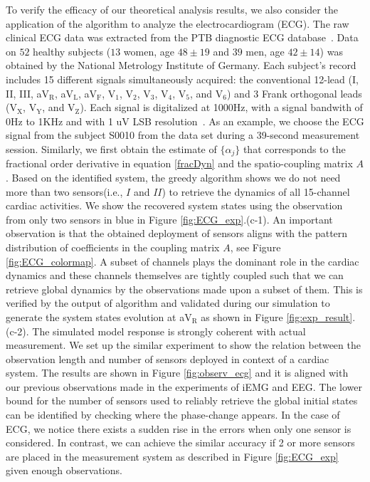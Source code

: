 To verify the efficacy of our theoretical analysis results, we also consider the application of the algorithm to analyze the electrocardiogram (ECG). The raw clinical ECG data was extracted from the PTB diagnostic ECG database~\cite{goldberger2000physiobank}. Data on $52$ healthy subjects ($13$ women, age $48 \pm 19$ and $39$ men, age $42 \pm 14$) was obtained by the National Metrology Institute of Germany. Each subject's record includes 15 different signals simultaneously acquired: the conventional 12-lead (I, II, III, aV$_{\text{R}}$, aV$_{\text{L}}$, aV$_{\text{F}}$, V$_{\text{1}}$, V$_{\text{2}}$, V$_{\text{3}}$, V$_{\text{4}}$, V$_{\text{5}}$, and V$_{\text{6}}$) and 3 Frank orthogonal leads (V$_{\text{X}}$, V$_{\text{Y}}$, and V$_{\text{Z}}$). Each signal is digitalized at 1000Hz, with a signal bandwith of 0Hz to 1KHz and with 1 uV LSB resolution~\cite{Bousseljot1995}. As an example, we choose the ECG signal from the subject S0010 from the data set during a 39-second measurement session. Similarly, we first obtain the estimate of $\{\alpha_{j}\}$ that corresponds to the fractional order derivative in equation \eqref{fracDyn} and the spatio-coupling matrix $A$. Based on the identified system, the greedy algorithm shows we do not need more than two sensors(i.e., $I$ and $II$) to retrieve the dynamics of all 15-channel cardiac activities. We show the recovered system states using the observation from only two sensors in blue in Figure \ref{fig:ECG_exp}.(c-1). An important observation is that the obtained deployment of sensors aligns with the pattern distribution of coefficients in the coupling matrix $A$, see Figure \ref{fig:ECG_colormap}. A subset of channels plays the dominant role in the cardiac dynamics and these channels themselves are tightly coupled such that we can retrieve global dynamics by the observations made upon a subset of them. This is verified by the output of algorithm and validated during our simulation to generate the system states evolution at aV$_{\text{R}}$ as shown in Figure \ref{fig:exp_result}.(c-2). The simulated model response is strongly coherent with actual measurement. We set up the similar experiment to show the relation between the observation length and number of sensors deployed in context of a cardiac system. The results are shown in Figure \ref{fig:observ_ecg} and it is aligned with our previous observations made in the experiments of iEMG and EEG. The lower bound for the number of sensors used to reliably retrieve the global initial states can be identified by checking where the  phase-change appears. In the case of ECG, we notice there exists a sudden rise in the errors when only one sensor is considered. In contrast, we can achieve the similar accuracy if 2 or more sensors are placed in the measurement system as described in Figure \ref{fig:ECG_exp} given enough observations.

